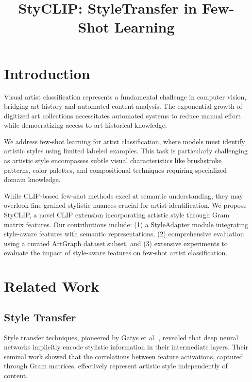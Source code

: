 \documentclass[conference,6pt]{IEEEtran}
\title{StyCLIP: StyleTransfer in Few-Shot Learning}
\author{
\IEEEauthorblockN{Emanuele Fontana}
\IEEEauthorblockA{
Università degli Studi di Bari Aldo Moro \\
Email: e.fontana7@studenti.uniba.it}
}
\begin{document}
\footnotesize 
\maketitle

\IEEEdisplaynontitleabstractindextext



\section{Introduction}

Visual artist classification represents a fundamental challenge in computer vision, bridging art history and automated content analysis. The exponential growth of digitized art collections necessitates automated systems to reduce manual effort while democratizing access to art historical knowledge.

We address few-shot learning for artist classification, where models must identify artistic styles using limited labeled examples. This task is particularly challenging as artistic style encompasses subtle visual characteristics like brushstroke patterns, color palettes, and compositional techniques requiring specialized domain knowledge.

While CLIP-based few-shot methods excel at semantic understanding, they may overlook fine-grained stylistic nuances crucial for artist identification. We propose StyCLIP, a novel CLIP extension incorporating artistic style through Gram matrix features. Our contributions include: (1) a StyleAdapter module integrating style-aware features with semantic representations, (2) comprehensive evaluation using a curated ArtGraph dataset subset, and (3) extensive experiments to evaluate the impact of style-aware features on few-shot artist classification.


\section{Related Work}

\subsection{Style Transfer}

Style transfer techniques, pioneered by Gatys et al. \cite{StyleTransfer}, revealed that deep neural networks implicitly encode stylistic information in their intermediate layers. Their seminal work showed that the correlations between feature activations, captured through Gram matrices, effectively represent artistic style independently of content.
\end{document}
